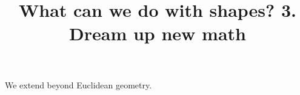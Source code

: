 \documentclass{ximera}
\title{What can we do with shapes? 3. Dream up new math}
\begin{document}
\begin{abstract}
\end{abstract}
\maketitle

We extend beyond Euclidean geometry.
\end{document}
